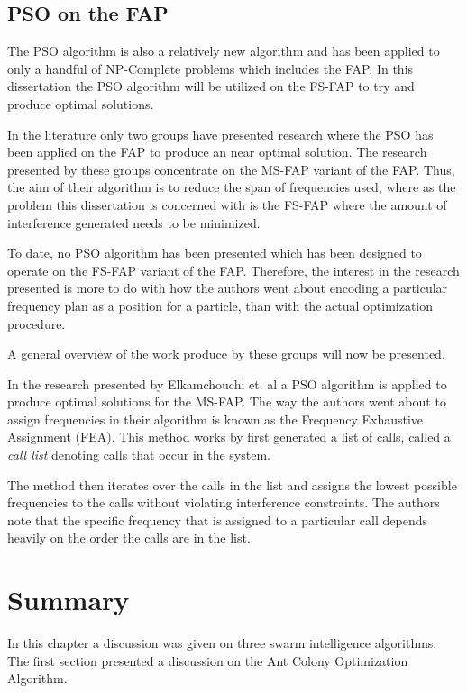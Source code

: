 \subsection{PSO on the FAP}
The PSO algorithm is also a relatively new algorithm and has been applied to only a handful of NP-Complete problems which includes the FAP. In this dissertation the PSO algorithm will be utilized on the FS-FAP to try and produce optimal solutions. 

In the literature only two groups have presented research where the PSO has been applied on the FAP to produce an near optimal solution. The research presented by these groups concentrate on the MS-FAP variant of the FAP. Thus, the aim of their algorithm is to reduce the span of frequencies used, where as the problem this dissertation is concerned with is the FS-FAP where the amount of interference generated needs to be minimized. 

To date, no PSO algorithm has been presented which has been designed to operate on the FS-FAP variant of the FAP. Therefore, the interest in the research presented is more to do with how the authors went about encoding a particular frequency plan as a position for a particle, than with the actual optimization procedure.

A general overview of the work produce by these groups will now be presented.

In the research presented by Elkamchouchi et. al\cite{EgyptFAPPSO} a PSO algorithm is applied to produce optimal solutions for the MS-FAP. The way the authors went about to assign frequencies in their algorithm is known as the Frequency Exhaustive Assignment (FEA).
This method works by first generated a list of calls, called a \emph{call list} denoting calls that occur in the system\cite{EgyptFAPPSO}. 

The method then iterates over the calls in the list and assigns the lowest possible frequencies to the calls without violating interference constraints\cite{EgyptFAPPSO}. The authors note that the specific frequency that is assigned to a particular call depends heavily on the order the calls are in the list\cite{EgyptFAPPSO}.


\section{Summary}
In this chapter a discussion was given on three swarm intelligence algorithms. The first section presented a discussion on the Ant Colony Optimization Algorithm.

